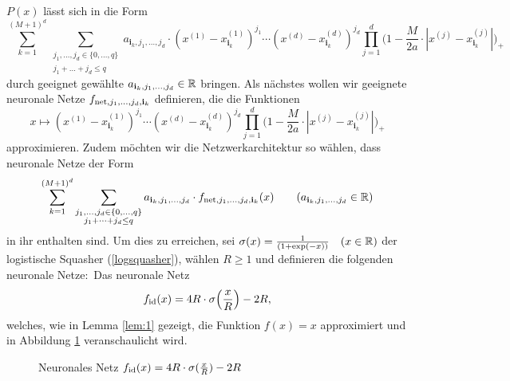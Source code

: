 $P(x)$ lässt sich in die Form 
$$\sum_{k = 1}^{(M + 1)^d} \sum_{\substack{ j_1,\dots,j_d \in \{0,\dots,q\} \\j_1+\dots +j_d \leq q}} a_{\mathbf{i}_k,j_1,\dots,j_d} \cdot (x^{(1)} - x_{\mathbf{i}_k}^{(1)})^{j_1} \cdots (x^{(d)} - x_{\mathbf{i}_k}^{(d)})^{j_d} \prod_{j = 1}^d \bigg(1 - \frac{M}{2a} \cdot |x^{(j)} - x_{\mathbf{i}_k}^{(j)}|\bigg)_+$$
durch geeignet gewählte $a_{\mathbf{i}_k,j_1,\dots,j_d} \in \mathbb{R}$ bringen.
Als nächstes wollen wir geeignete neuronale Netze $f_{\mathrm{net},j_1,\dots,j_d,\mathbf{i}_k}$ definieren, die die Funktionen
$$x \mapsto (x^{(1)} - x_{\mathbf{i}_k}^{(1)})^{j_1} \cdots (x^{(d)} - x_{\mathbf{i}_k}^{(d)})^{j_d} \prod_{j = 1}^d \bigg(1 - \frac{M}{2a} \cdot |x^{(j)} - x_{\mathbf{i}_k}^{(j)}|\bigg)_+$$ approximieren. Zudem möchten wir die Netzwerkarchitektur so wählen, dass neuronale Netze der Form
$$\sum_{k = 1}^{(M + 1)^d} \sum_{\substack{ j_1,\dots,j_d \in \{0,\dots,q\} \\j_1+\dots +j_d \leq q}} a_{\mathbf{i}_k,j_1,\dots,j_d} \cdot f_{\mathrm{net},j_1,\dots,j_d,\mathbf{i}_k}(x) \qquad (a_{\mathbf{i}_k,j_1,\dots,j_d} \in \mathbb{R})$$ in ihr enthalten sind.
Um dies zu erreichen, sei $\sigma(x) = \frac{1}{(1 + \exp(-x))} \quad (x \in \mathbb{R})$ der logistische Squasher (\ref{logsquasher}), wählen $R \geq 1$ und definieren die folgenden neuronale Netze$\colon$
Das neuronale Netz
\begin{equation}
\label{def:fid}
f_{\mathrm{id}}(x) = 4R \cdot \sigma\Big(\frac{x}{R}\Big) - 2R,
\end{equation}
welches, wie in Lemma \ref{lem:1} gezeigt, die Funktion $f(x) = x$ approximiert und in Abbildung \ref{fig:fid} veranschaulicht wird.
\begin{figure}[htp]
\centering
{}

\caption{Neuronales Netz $f_{\mathrm{id}}(x) = 4R \cdot \sigma(\frac{x}{R}) - 2R$}
\label{fig:fid}
\end{figure}

